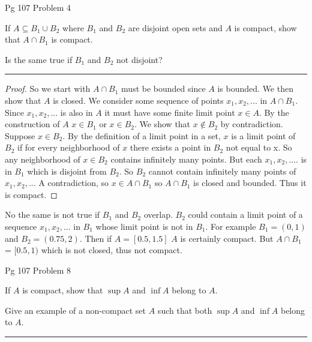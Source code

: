 \documentclass[11pt]{article}
\begin{document}
\newpage
{} Pg 107 Problem 4

If $A \subseteq B_1 \cup B_2$ where $B_1$ and $B_2$ are disjoint open sets and $A$ is compact, show that $A \cap B_1$ is compact. 

Is the same true if $B_1$ and $B_2$ not disjoint?

\hrule

\begin{proof}

So we start with $A \cap B_1$ must be bounded since $A$ is bounded. We then show that $A$ is closed. We consider some sequence of points $x_1, x_2, ...$ in $A \cap B_1$. Since $x_1, x_2, ...$ is also in $A$ it must have some finite limit point $x \in A$. By the construction of $A$ $x \in B_1$ or $x \in B_2$. 
We show that $x \notin B_2$ by contradiction. Suppose $x \in B_2$. By the definition of a limit point in a set, $x$ is a limit point of $B_2$ if for every neighborhood of $x$ there exists a point in $B_2$ not equal to x. So any neighborhood of $x \in B_2$ contains infinitely many points. 
But each $x_1, x_2, ....$ is in $B_1$ which is disjoint from $B_2$. So $B_2$ cannot contain infinitely many points of $x_1, x_2,...$ A contradiction, so $x \in A \cap B_1$ so $A \cap B_1$ is closed and bounded. Thus it is compact.

\end{proof}

No the same is not true if $B_1$ and $B_2$ overlap. $B_2$ could contain a limit point of a sequence $x_1, x_2,...$ in $B_1$ whose limit point is not in $B_1$. For example $B_1 = (0,1)$ and $B_2 = (0.75, 2)$. Then if $A = [0.5, 1.5]$ $A$ is certainly compact. But $A \cap B_1$ = $[0.5, 1)$ which is not closed, thus not compact.


\newpage
{} Pg 107 Problem 8

If $A$ is compact, show that $\sup A$ and $\inf A$ belong to $A$. 

Give an example of a non-compact set $A$ such that both $\sup A$ and $\inf A$ belong to $A$.

\hrule
\end{document}
